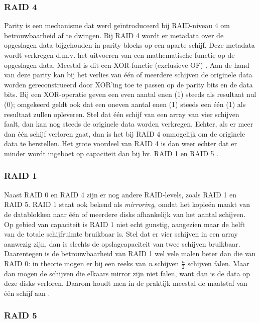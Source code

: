 \subsubsection{RAID 4}

Parity is een mechanisme dat werd geïntroduceerd bij RAID-niveau 4 om betrouwbaarheid af te dwingen. Bij RAID 4 wordt er metadata over de opgeslagen data bijgehouden in parity blocks op een aparte schijf. Deze metadata wordt verkregen d.m.v. het uitvoeren van een mathematische functie op de opgeslagen data. Meestal is dit een XOR-functie (exclusieve OF) \autocite{Chen1994}. Aan de hand van deze parity kan bij het verlies van één of meerdere schijven de originele data worden gereconstrueerd door XOR'ing toe te passen op de parity bits en de data bits. Bij een XOR-operatie geven een even aantal enen (1) steeds als resultaat nul (0); omgekeerd geldt ook dat een oneven aantal enen (1) steeds een één (1) als resultaat zullen opleveren. Stel dat één schijf van een array van vier schijven faalt, dan kan nog steeds de originele data worden verkregen. Echter, als er meer dan één schijf verloren gaat, dan is het bij RAID 4 onmogelijk om de originele data te herstellen. Het grote voordeel van RAID 4 is dan weer echter dat er minder wordt ingeboet op capaciteit  dan bij bv. RAID 1 en RAID 5 \autocite{OSThreePiecesRemzi2015}. 

\subsubsection{RAID 1}

Naast RAID 0 en RAID 4 zijn er nog andere RAID-levels, zoals RAID 1 en RAID 5. RAID 1 staat ook bekend als \textit{mirroring}, omdat het kopieën maakt van de datablokken naar één of meerdere disks afhankelijk van het aantal schijven. Op gebied van capaciteit is RAID 1 niet echt gunstig, aangezien maar de helft van de totale schijfruimte bruikbaar is. Stel dat er vier schijven in een array aanwezig zijn, dan is slechts de opslagcapaciteit van twee schijven bruikbaar. Daarentegen is de betrouwbaarheid van RAID 1 wel vele malen beter dan die van RAID 0: in theorie mogen er bij een reeks van \textit{n} schijven $\frac{n}{2}$ schijven falen. Maar dan mogen de schijven die elkaars mirror zijn niet falen, want dan is de data op deze disks verloren.  Daarom houdt men in de praktijk meestal de maatstaf van één schijf aan \autocite{OSThreePiecesRemzi2015}.

\subsubsection{RAID 5}

